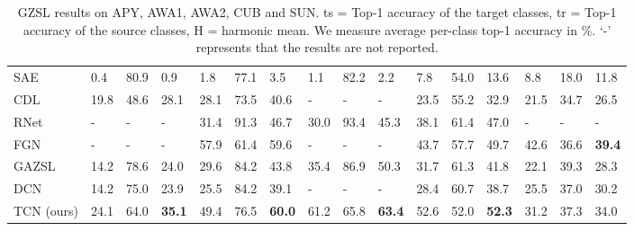 \documentclass[10pt,twocolumn,letterpaper]{article}
\begin{document}
\begin{table*}[t]
\begin{center}
\begin{tabular}{|p{2cm}|p{0.5cm}p{0.5cm}p{0.5cm}|p{0.5cm}p{0.5cm}p{0.5cm}|p{0.5cm}p{0.5cm}p{0.5cm}|p{0.5cm}p{0.5cm}p{0.5cm}|p{0.5cm}p{0.5cm}p{0.5cm}|}
SAE \cite{Kodirov2017SemanticAF}          &0.4   &80.9   &0.9   &1.8   &77.1   &3.5    &1.1   &82.2   &2.2    &7.8    &54.0   &13.6   &8.8    &18.0   &11.8 \\
CDL \cite{jiang2018learning}              &19.8  &48.6   &28.1  &28.1  &73.5   &40.6   &-     &-      &-      &23.5   &55.2   &32.9   &21.5   &34.7   &26.5 \\
RNet \cite{sung2018learning}              &-     &-      &-     &31.4  &91.3   &46.7   &30.0  &93.4   &45.3   &38.1   &61.4   &47.0   &-      &-      &-    \\
FGN \cite{xian2018feature}             &-     &-      &-     &57.9  &61.4   &59.6   &-     &-      &-   &43.7   &57.7   &49.7   &42.6    &36.6 &\textbf{39.4}    \\
GAZSL \cite{Zhu2018AGA}               &14.2  &78.6   &24.0  &29.6  &84.2   &43.8   &35.4     &86.9      &50.3      &31.7   &61.3   &41.8   &22.1 &39.3   &28.3 \\
DCN \cite{Liu2018GeneralizedZL}        &14.2  &75.0   &23.9  &25.5  &84.2   &39.1   &-     &-      &-      &28.4   &60.7   &38.7   &25.5   &37.0 &30.2 \\
\hline
TCN (ours)                               &24.1  &64.0   &\textbf{35.1}  &49.4  &76.5   &\textbf{60.0}   &61.2  &65.8   &\textbf{63.4}   &52.6 &52.0   &\textbf{52.3}   &31.2   &37.3   &34.0 \\
\hline
\end{tabular}
\end{center}
\caption{
GZSL results on APY, AWA1, AWA2, CUB and SUN. ts = Top-1 accuracy of the target classes, tr = Top-1 accuracy of the source classes, H = harmonic mean. We measure average per-class top-1 accuracy in \%. `-' represents that the results are not reported.
}
\label{table:compare2}
\end{table*}
\end{document}
